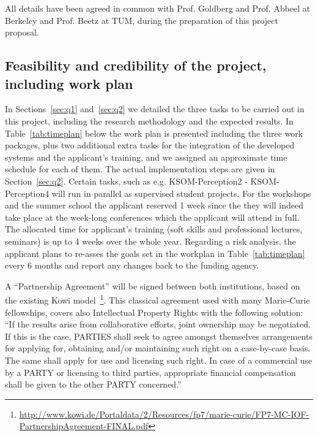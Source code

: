 All details  have been agreed in  common with Prof. Goldberg and Prof. Abbeel  
at Berkeley and Prof. Beetz at TUM, during the preparation of this project proposal.

\subsection{Feasibility and credibility of the project, including work plan} 
In Sections~\ref{sec:q1} and~\ref{sec:q2} we detailed the three tasks to be carried 
out in this project, including the research methodology and the expected results. 
In Table~\ref{tab:timeplan} below the work plan is presented including the three 
work packages, plus two additional extra tasks for the integration of the developed systems
and the applicant's training, and we assigned an approximate time schedule for each of them.
The actual implementation steps are given in Section~\ref{sec:q2}. Certain tasks, such as e.g.
KSOM-Perception2 - KSOM-Perception4 will run in parallel as supervised student projects. 
For the workshops and the summer school the applicant reserved 1 week since the they will 
indeed take place at the week-long conferences which the applicant will attend in full.
The allocated time for applicant's training (soft skills and professional lectures, seminars)
is up to 4 weeks over the whole year. Regarding a risk analysis, the applicant plans to re-asses 
the goals set in the workplan in Table~\ref{tab:timeplan} every 6 months and report 
any changes back to the funding agency.   

A ``Partnership  Agreement'' will  be signed between  both institutions,
based on the existing Kowi model~\footnote{\url{http://www.kowi.de/Portaldata/2/Resources/fp7/marie-curie/FP7-MC-IOF-PartnershipAgreement-FINAL.pdf}}. This classical  agreement used  with many  Marie-Curie  fellowships, covers
also   Intellectual   Property   Rights   with  the   following
solution: ``If  the  results arise  from  collaborative efforts,  joint
ownership may be  negotiated. If this is the  case, PARTIES shall seek
to agree  amongst themselves arrangements for  applying for, obtaining
and/or maintaining such right on  a case-by-case basis. The same shall
apply for use and licensing such right. In case of a commercial use by
a  PARTY   or  licensing  to  third   parties,  appropriate  financial
compensation shall be given to the other PARTY concerned.''


